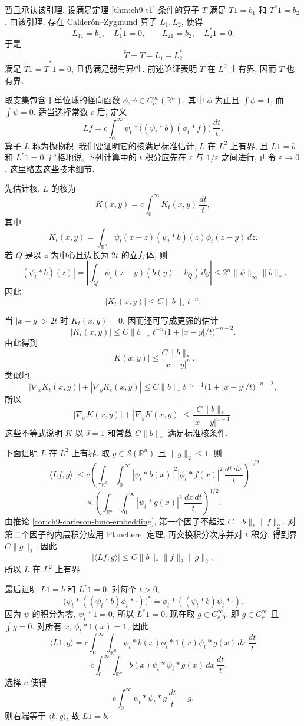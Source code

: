 暂且承认该引理. 设满足定理 \ref{thm:ch9-t1} 条件的算子 $T$ 满足 $T1=b_1$ 和 $T^*1=b_2$. 由该引理, 存在 Calderón--Zygmund 算子 $L_1,L_2$, 使得
\[
 L_11=b_1,\quad L_1^*1=0,\qquad L_21=b_2,\quad L_2^*1=0.
\]
于是
\[
 \widetilde T=T-L_1-L_2^*
\]
满足 $\widetilde T1=\widetilde T^*1=0$, 且仍满足弱有界性. 前述论证表明 $\widetilde T$ 在 $L^2$ 上有界, 因而 $T$ 也有界.

\begin{Proof}
取支集包含于单位球的径向函数 $\phi,\psi\in C_c^\infty(\mathbb R^n)$, 其中 $\phi$ 为正且 $\int\phi=1$, 而 $\int\psi=0$. 适当选择常数 $c$ 后, 定义
\[
 Lf=c\int_0^\infty\psi_t*\bigl((\psi_t*b)(\phi_t*f)\bigr)\,\frac{dt}{t}.
\]
算子 $L$ 称为抛物积. 我们要证明它的核满足标准估计, $L$ 在 $L^2$ 上有界, 且 $L1=b$ 和 $L^*1=0$. 严格地说, 下列计算中的 $t$ 积分应先在 $\varepsilon$ 与 $1/\varepsilon$ 之间进行, 再令 $\varepsilon\to0$. 这里略去这些技术细节.

先估计核. $L$ 的核为
\[
 K(x,y)=c\int_0^\infty K_t(x,y)\,\frac{dt}{t},
\]
其中
\[
 K_t(x,y)=\int_{\mathbb R^n}\psi_t(x-z)(\psi_t*b)(z)\phi_t(z-y)\,dz.
\]
若 $Q$ 是以 $z$ 为中心且边长为 $2t$ 的立方体, 则
\[
 |(\psi_t*b)(z)|
 =\left|\int_Q\psi_t(z-y)(b(y)-b_Q)\,dy\right|
 \leq2^n\|\psi\|_\infty\|b\|_*.
\]
因此
\[
 |K_t(x,y)|\leq C\|b\|_*t^{-n}.
\]

\hypertarget{chapter-09-page-223}{}

当 $|x-y|>2t$ 时 $K_t(x,y)=0$, 因而还可写成更强的估计
\[
 |K_t(x,y)|\leq C\|b\|_*t^{-n}
 \bigl(1+|x-y|/t\bigr)^{-n-2}.
\]
由此得到
\[
 |K(x,y)|\leq\frac{C\|b\|_*}{|x-y|^n}.
\]
类似地,
\[
 |\nabla_xK_t(x,y)|+|\nabla_yK_t(x,y)|
 \leq C\|b\|_*t^{-n-1}
 \bigl(1+|x-y|/t\bigr)^{-n-2},
\]
所以
\[
 |\nabla_xK(x,y)|+|\nabla_yK(x,y)|
 \leq\frac{C\|b\|_*}{|x-y|^{n+1}}.
\]
这些不等式说明 $K$ 以 $\delta=1$ 和常数 $C\|b\|_*$ 满足标准核条件.

下面证明 $L$ 在 $L^2$ 上有界. 取 $g\in\mathcal S(\mathbb R^n)$ 且 $\|g\|_2\leq1$. 则
\[
 |\langle Lf,g\rangle|
 \leq c\left(\int_{\mathbb R^n}\int_0^\infty
 |\psi_t*b(x)|^2|\phi_t*f(x)|^2\,\frac{dt\,dx}{t}\right)^{1/2}
\]
\[
 {}\times\left(\int_{\mathbb R^n}\int_0^\infty
 |\psi_t*g(x)|^2\,\frac{dx\,dt}{t}\right)^{1/2}.
\]
由推论 \ref{cor:ch9-carleson-bmo-embedding}, 第一个因子不超过 $C\|b\|_*\|f\|_2$. 对第二个因子的内层积分应用 Plancherel 定理, 再交换积分次序并对 $t$ 积分, 得到界 $C\|g\|_2$. 因此
\[
 |\langle Lf,g\rangle|\leq C\|b\|_*\|f\|_2\|g\|_2,
\]
所以 $L$ 在 $L^2$ 上有界.

最后证明 $L1=b$ 和 $L^*1=0$. 对每个 $t>0$,
\[
 \bigl(\psi_t*((\psi_t*b)\phi_t*\mathbin{\cdot})\bigr)^*
 =\phi_t*((\psi_t*b)\psi_t*\mathbin{\cdot}).
\]
因为 $\psi$ 的积分为零, $\psi_t*1=0$, 所以 $L^*1=0$. 现在取 $g\in C_{c,0}^\infty$, 即 $g\in C_c^\infty$ 且 $\int g=0$. 对所有 $x$, $\phi_t*1(x)=1$, 因此
\[
 \langle L1,g\rangle
 =c\int_0^\infty\int_{\mathbb R^n}
 \psi_t*b(x)\phi_t*1(x)\psi_t*g(x)\,dx\,\frac{dt}{t}
\]
\[
 =c\int_0^\infty\int_{\mathbb R^n}
 b(x)\psi_t*\psi_t*g(x)\,dx\,\frac{dt}{t}.
\]
选择 $c$ 使得
\begin{equation}
\label{eq:ch9-calderon-reproducing-formula}
 c\int_0^\infty\psi_t*\psi_t*g\,\frac{dt}{t}=g.
\tag{9.9}
\end{equation}
则右端等于 $\langle b,g\rangle$, 故 $L1=b$.


\end{Proof}
